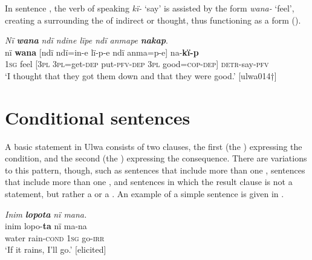  In sentence , the verb of speaking \textit{kï-} ‘say’ is assisted by the form \textit{wana-} ‘feel’, creating a  surrounding the  of indirect  or thought, thus functioning as a   form ().


\ea%
    \label{ex:syntax:239}
          \textit{Nï} \textbf{\textit{wana}} \textit{ndï ndine lïpe ndï anmape} \textbf{\textit{nakap}}.\\
\gll nï    \textbf{wana}  {[ndï}  ndï=in-e    lï-p-e      ndï {anma=p-e]}      na-\textbf{kï-p}\\
    1\textsc{sg}  feel  [3\textsc{pl}  3\textsc{pl}=get-\textsc{dep}  put-\textsc{pfv-dep}  \textsc{3pl} good=\textsc{cop{}-dep]}  \textsc{detr}{}-say-\textsc{pfv}\\
\glt `I thought that they got them down and that they were good.’ [ulwa014†]
\z

\section{Conditional sentences}\label{sec:13.5}


 A basic  statement in Ulwa consists of two clauses, the first (the ) expressing the condition, and the second (the ) expressing the consequence. There are variations to this pattern, though, such as sentences that include more than one , sentences that include more than one , and sentences in which the result clause is not a statement, but rather a  or a . An example of a simple  sentence is given in .

\ea%
    \label{ex:syntax:240}
          \textit{Inim} \textbf{\textit{lopota}} \textit{nï mana.}\\
\gll    inim  lopo-\textbf{ta}        nï    ma-na\\
    water  rain-\textsc{cond}    \textsc{1sg}  go-\textsc{irr}\\
\glt `If it rains, I’ll go.’ [elicited]
\z

